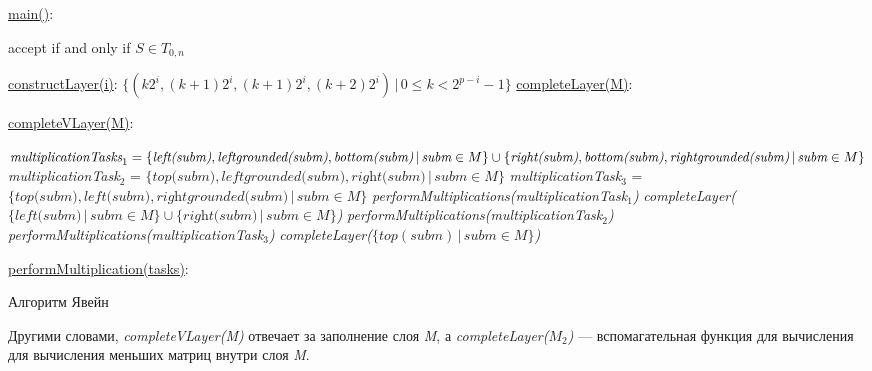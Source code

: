 \documentclass[14pt]{matmex-diploma-custom}
\begin{document}
\begin{algorithm}[!h]
\SetAlgoNoLine
{}
\underline{main()}{:}{

 accept if and only if $S \in T_{0, n}$
 \BlankLine
 }

\underline{constructLayer(i)}{:}{
 \BlankLine
 $\{(k2^i, (k+1)2^i, (k + 1)2^i, (k+2)2^i) \, |\, 0 \le k < 2^{p - i} - 1\}$
 \BlankLine
    }
\underline{completeLayer(M)}{:}{
\BlankLine
{}
\BlankLine
}

\underline{completeVLayer(M)}{:}{
 \BlankLine
 $\textit{multiplicationTasks}_1 = \linebreak
    \{\textit{left(subm)}, \textit{leftgrounded(subm)}, \textit{bottom(subm)}\, 
    |\,\textit{subm} \in M \} \cup \linebreak  \{\textit{right(subm)}, \textit{bottom(subm)}, \textit{rightgrounded(subm)}\, |\,\textit{subm} \in M\}$\;
 \BlankLine
 \textit{multiplicationTask$_2$} = $\{\textit{top(subm)}, \textit{leftgrounded(subm)}, \textit{right(subm)}\, |\,\textit{subm} \in M\}$\;
 \BlankLine
 \textit{multiplicationTask$_3$} = $\{\textit{top(subm)}, \textit{left(subm)}, \textit{rightgrounded(subm)}\, |\,\textit{subm} \in M\}$\;
 \BlankLine
 \textit{performMultiplications(multiplicationTask$_1$)}\;
 \textit{completeLayer($\{\textit{left(subm)}\, |\,subm \in M \} \cup \{\textit{right(subm)}\, |\,\textit{subm} \in M \}$)}\;
 \textit{performMultiplications(multiplicationTask$_2$)}\;
 \textit{performMultiplications(multiplicationTask$_3$)}\;
 \textit{completeLayer($\{top(subm)\, |\,subm \in M \}$)}

 }
 \BlankLine

 \underline{performMultiplication(tasks)}{:}{\\
 }

\caption{Алгоритм Явейн}
\label{algo:modified}
\end{algorithm}


Другими словами, \textit{completeVLayer(M)} отвечает за заполнение слоя \textit{M}, а \textit{completeLayer($M_{2}$)} --- вспомагательная функция для вычисления для вычисления меньших матриц внутри слоя \textit{M}.
\end{document}

